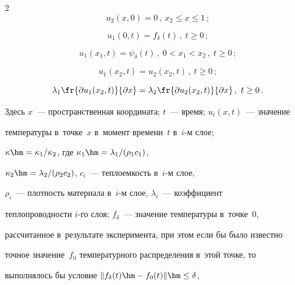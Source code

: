 \begin{multicols}{2}
\begin{equation}
  u_2(x,0)=0\,,\ x_2\leq x\leq1\,;\label{e4-sr}

  \end{equation}

      \begin{equation}

  u_1(0,t)=f_\delta(t)\,,\ t\geq 0\,;

  \label{e5-sr}

  \end{equation}

  \begin{equation}

  u_1(x_1,t)=\psi_\delta(t)\,,\ 0<x_1<x_2\,,\ t\geq0\,;

  \label{e6-sr}

  \end{equation}

  \begin{equation}

  u_1(x_2,t)=u_2(x_2,t)\,,\ t\geq 0\,;

  \label{e7-sr}

  \end{equation}

  \begin{equation}

  \lambda_1\fr{\partial u_1(x_2,t)}{\partial x} =\lambda_2 \fr{\partial 

u_2(x_2,t)}{\partial x}\,,\ t\geq0\,.

  \label{e8-sr}

  \end{equation}

Здесь $x$~--- пространственная координата; $t$~--- время; $u_i(x,t)$~--- значение 

температуры в~точке~$x$ в~момент времени~$t$ в~$i$-м слое; 

$\kappa\hm=\kappa_1/\kappa_2$, где $\kappa_1\hm= \lambda_1/(\rho_1c_1)$, 

$\kappa_2\hm= \lambda_2/(\rho_2 c_2)$, $c_i$~--- теплоемкость в~$i$-м слое, 

$\rho_i$~--- плотность материала в~$i$-м слое, $\lambda_i$~--- коэффициент 

теплопроводности $i$-го слоя; $f_\delta$~--- значение температуры в~точке~0, 

рассчитанное в~результате эксперимента, при этом если бы было известно 

точное значение~$f_0$ температурного распределения в~этой точке, то 

выполнялось бы условие $\| f_\delta (t) \hm- f_0(t)\| \hm\leq \delta$, 


\end{multicols}
